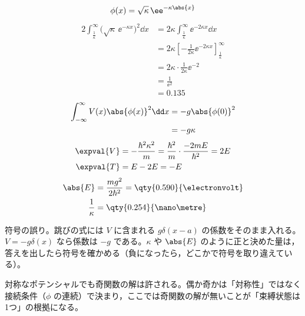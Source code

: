 \[ \phi(x)=\sqrt{\kappa}\,\ee^{-\kappa\abs{x}} \]
\begin{align*}
2\int_{\frac{1}{\kappa}}^{\infty}\bigl(\sqrt{\kappa}\,\ee^{-\kappa x}\bigr)^{2}\dd x&=2\kappa\int_{\frac{1}{\kappa}}^{\infty}\ee^{-2\kappa x}\dd x\\
&=2\kappa\left[-\frac{1}{2\kappa}\ee^{-2\kappa x}\right]_{\frac{1}{\kappa}}^{\infty}\\
&=2\kappa\cdot\frac{1}{2\kappa}\ee^{-2}\\
&=\frac{1}{\ee^{2}}\\
&=\num{0.135}
\end{align*}
\begin{align*}
\int_{-\infty}^{\infty}V(x)\abs{\phi(x)}^{2}\dd x&=-g\abs{\phi(0)}^{2}\\
&=-g\kappa
\end{align*}
\begin{align*}
\expval{V}&=-\frac{\hbar^{2}\kappa^{2}}{m}=\frac{\hbar^{2}}{m}\cdot\frac{-2mE}{\hbar^{2}}=2E\\
\expval{T}&=E-2E=-E
\end{align*}
\begin{align*}
\abs{E}&=\frac{mg^{2}}{2\hbar^{2}}=\qty{0.590}{\electronvolt}\\
\frac{1}{\kappa}&=\qty{0.254}{\nano\metre}
\end{align*}
\item {} 符号の誤り。跳びの式には $V$ に含まれる $g\delta(x-a)$ の係数をそのまま入れる。$V=-g\delta(x)$ なら係数は $-g$ である。$\kappa$ や $\abs{E}$ のように正と決めた量は，答えを出したら符号を確かめる（負になったら，どこかで符号を取り違えている）。
\item 対称なポテンシャルでも奇関数の解は許される。偶か奇かは「対称性」ではなく接続条件（$\phi$ の連続）で決まり，ここでは奇関数の解が無いことが「束縛状態は1つ」の根拠になる。
